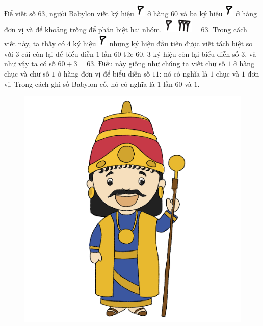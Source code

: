 \begin{multicols}{2}
	\vskip 0.1cm
	Để viết số $63$, người Babylon viết ký hiệu  \includegraphics[scale=0.7]{15}  ở hàng $60$ và ba ký hiệu \includegraphics[scale=0.7]{15}  ở hàng đơn vị và để khoảng trống để phân biệt hai nhóm.
	\vskip 0.1cm
	\includegraphics[scale=0.7]{16.1}$=63$. Trong cách viết này, ta thấy có $4$ ký hiệu \includegraphics[scale=0.7]{15}   nhưng ký hiệu đầu tiên được viết tách biệt so với $3$ cái còn lại để biểu diễn $1$ lần $60$ tức $60$, $3$ ký hiệu còn lại biểu diễn số $3$, và như vậy ta có số $60+3 =63$.
	\vskip 0.1cm
	Điều này giống như chúng ta viết chữ số $1$ ở hàng chục và chữ số $1$ ở hàng đơn vị để biểu diễn số $11$: nó có nghĩa là $1$ chục và $1$ đơn vị. Trong  cách ghi số  Babylon cổ, nó có nghĩa là $1$ lần $60$  và $1$.
	\begin{figure}[H]
		\centering
		\vspace*{-5pt}
		\captionsetup{labelformat= empty, justification=centering}
		\includegraphics[width=0.85\linewidth]{20.12-pi.2}

\end{figure}
\end{multicols}
